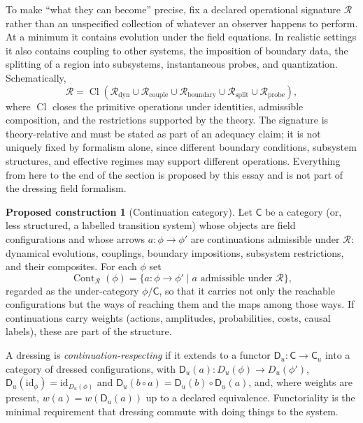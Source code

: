 \documentclass[11pt]{article}
\theoremstyle{plain}
\theoremstyle{definition}
\newtheorem{construction}{Proposed construction}
\theoremstyle{remark}
\newcommand{\R}{\mathcal R}
\newcommand{\Cont}{\operatorname{Cont}}
\begin{document}
To make ``what they can become'' precise, fix a declared operational signature $\R$ rather than an unspecified collection of whatever an observer happens to perform. At a minimum it contains evolution under the field equations. In realistic settings it also contains coupling to other systems, the imposition of boundary data, the splitting of a region into subsystems, instantaneous probes, and quantization. Schematically,
\begin{equation}\label{eq:opsig}
\R=\operatorname{Cl}\!\left(\R_{\mathrm{dyn}}\cup\R_{\mathrm{couple}}\cup\R_{\mathrm{boundary}}\cup\R_{\mathrm{split}}\cup\R_{\mathrm{probe}}\right),
\end{equation}
where $\operatorname{Cl}$ closes the primitive operations under identities, admissible composition, and the restrictions supported by the theory. The signature is theory-relative and must be stated as part of an adequacy claim; it is not uniquely fixed by formalism alone, since different boundary conditions, subsystem structures, and effective regimes may support different operations. Everything from here to the end of the section is proposed by this essay and is not part of the dressing field formalism.

\begin{construction}[Continuation category]\label{con:cat}
Let $\mathsf C$ be a category (or, less structured, a labelled transition system) whose objects are field configurations and whose arrows $a:\phi\to\phi'$ are continuations admissible under $\R$: dynamical evolutions, couplings, boundary impositions, subsystem restrictions, and their composites. For each $\phi$ set
\begin{equation}
\Cont_\R(\phi)=\{a:\phi\to\phi'\mid a \text{ admissible under } \R\},
\end{equation}
regarded as the under-category $\phi/\mathsf C$, so that it carries not only the reachable configurations but the ways of reaching them and the maps among those ways. If continuations carry weights (actions, amplitudes, probabilities, costs, causal labels), these are part of the structure.
\end{construction}

A dressing is \emph{continuation-respecting} if it extends to a functor $\mathsf D_u:\mathsf C\to\mathsf C_u$ into a category of dressed configurations, with $\mathsf D_u(a):D_u(\phi)\to D_u(\phi')$, $\mathsf D_u(\mathrm{id}_\phi)=\mathrm{id}_{D_u(\phi)}$ and $\mathsf D_u(b\circ a)=\mathsf D_u(b)\circ\mathsf D_u(a)$, and, where weights are present, $w(a)=w(\mathsf D_u(a))$ up to a declared equivalence. Functoriality is the minimal requirement that dressing commute with doing things to the system.
\end{document}
